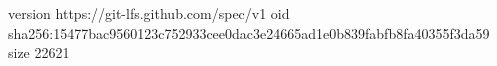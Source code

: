 version https://git-lfs.github.com/spec/v1
oid sha256:15477bac9560123c752933cee0dac3e24665ad1e0b839fabfb8fa40355f3da59
size 22621
